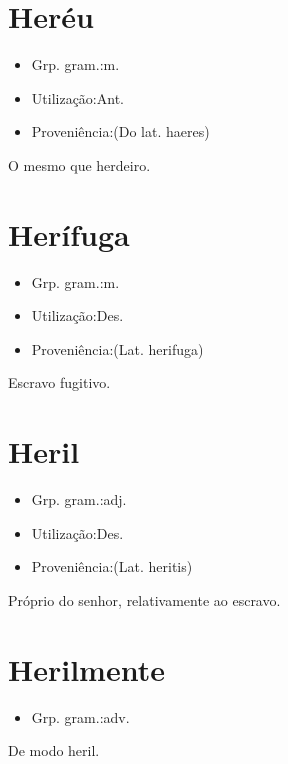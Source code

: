 \documentclass{article}
\begin{document}
\section{Heréu}
\begin{itemize}
\item {Grp. gram.:m.}
\end{itemize}
\begin{itemize}
\item {Utilização:Ant.}
\end{itemize}
\begin{itemize}
\item {Proveniência:(Do lat. \textunderscore haeres\textunderscore )}
\end{itemize}
O mesmo que \textunderscore herdeiro\textunderscore .
\section{Herífuga}
\begin{itemize}
\item {Grp. gram.:m.}
\end{itemize}
\begin{itemize}
\item {Utilização:Des.}
\end{itemize}
\begin{itemize}
\item {Proveniência:(Lat. \textunderscore herifuga\textunderscore )}
\end{itemize}
Escravo fugitivo.
\section{Heril}
\begin{itemize}
\item {Grp. gram.:adj.}
\end{itemize}
\begin{itemize}
\item {Utilização:Des.}
\end{itemize}
\begin{itemize}
\item {Proveniência:(Lat. \textunderscore heritis\textunderscore )}
\end{itemize}
Próprio do senhor, relativamente ao escravo.
\section{Herilmente}
\begin{itemize}
\item {Grp. gram.:adv.}
\end{itemize}
De modo heril.
\end{document}
